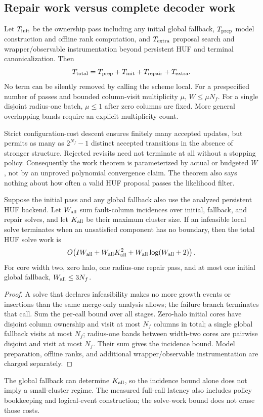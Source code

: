 \subsection{Repair work versus complete decoder work}
Let $T_{\rm init}$ be the ownership pass including any initial global fallback, $T_{\rm prep}$ model construction and offline rank computation, and $T_{\rm extra}$ proposal search and wrapper/observable instrumentation beyond persistent HUF and terminal canonicalization. Then
\[T_{\rm total}=T_{\rm prep}+T_{\rm init}+T_{\rm repair}+T_{\rm extra}.\]
No term can be silently removed by calling the scheme local. For a prespecified number of passes and bounded column-visit multiplicity $\mu$, $W\le\mu N_f$. For a single disjoint radius-one batch, $\mu\le1$ after zero columns are fixed. More general overlapping bands require an explicit multiplicity count.

Strict configuration-cost descent ensures finitely many accepted updates, but permits as many as $2^{N_f}-1$ distinct accepted transitions in the absence of stronger structure. Rejected revisits need not terminate at all without a stopping policy. Consequently the work theorem is parameterized by actual or budgeted $W$, not by an unproved polynomial convergence claim. The theorem also says nothing about how often a valid HUF proposal passes the likelihood filter.

\begin{corollary}
Suppose the initial pass and any global fallback also use the analyzed persistent HUF backend. Let $W_{\rm all}$ sum fault-column incidences over initial, fallback, and repair solves, and let $K_{\rm all}$ be their maximum cluster size. If an infeasible local solve terminates when an unsatisfied component has no boundary, then the total HUF solve work is
\[
O\!\left(IW_{\rm all}+W_{\rm all}K_{\rm all}^{2}+W_{\rm all}\log(W_{\rm all}+2)\right).
\]
For core width two, zero halo, one radius-one repair pass, and at most one initial global fallback, $W_{\rm all}\le3N_f$.
\end{corollary}
\begin{proof}
A solve that declares infeasibility makes no more growth events or insertions than the same merge-only analysis allows; the failure branch terminates that call. Sum the per-call bound over all stages. Zero-halo initial cores have disjoint column ownership and visit at most $N_f$ columns in total; a single global fallback visits at most $N_f$; radius-one bands between width-two cores are pairwise disjoint and visit at most $N_f$. Their sum gives the incidence bound. Model preparation, offline ranks, and additional wrapper/observable instrumentation are charged separately.
\end{proof}
The global fallback can determine $K_{\rm all}$, so the incidence bound alone does not imply a small-cluster regime. The measured full-call latency also includes policy bookkeeping and logical-event construction; the solve-work bound does not erase those costs.

